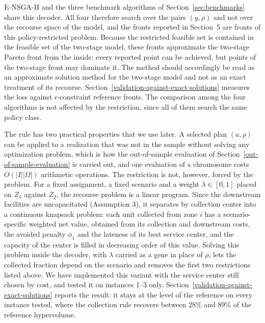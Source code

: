 \documentclass[11pt, a4paper]{article}
\begin{document}
E-NSGA-II and the three benchmark algorithms of Section~\ref{sec:benchmarks} share this decoder. All four therefore search over the pairs $(y,\rho)$ and not over the recourse space of the model, and the fronts reported in Section~5 are fronts of this policy-restricted problem. Because the restricted feasible set is contained in the feasible set of the two-stage model, these fronts approximate the two-stage Pareto front from the inside: every reported point can be achieved, but points of the two-stage front may dominate it. The method should accordingly be read as an approximate solution method for the two-stage model and not as an exact treatment of its recourse. Section~\ref{validation-against-exact-solutions} measures the loss against $\epsilon$-constraint reference fronts. The comparison among the four algorithms is not affected by the restriction, since all of them search the same policy class.

The rule has two practical properties that we use later. A selected plan $(a,\rho)$ can be applied to a realization that was not in the sample without solving any optimization problem, which is how the out-of-sample evaluation of Section~\ref{out-of-sample-evaluation} is carried out, and one evaluation of a chromosome costs $O(|I||\Omega|)$ arithmetic operations. The restriction is not, however, forced by the problem. For a fixed assignment, a fixed scenario and a weight $\lambda\in[0,1]$ placed on $Z_1$ against $Z_2$, the recourse problem is a linear program. Since the downstream facilities are uncapacitated (Assumption 3), it separates by collection center into a continuous knapsack problem: each unit collected from zone $i$ has a scenario-specific weighted net value, obtained from its collection and downstream costs, the avoided penalty $\phi_1$ and the lateness of its best service center, and the capacity of the center is filled in decreasing order of this value. Solving this problem inside the decoder, with $\lambda$ carried as a gene in place of $\rho$, lets the collected fraction depend on the scenario and removes the first two restrictions listed above. We have implemented this variant with the service center still chosen by cost, and tested it on instances 1--3 only. Section~\ref{validation-against-exact-solutions} reports the result: it stays at the level of the reference on every instance tested, where the collection rule recovers between 28\% and 89\% of the reference hypervolume. %
\end{document}
